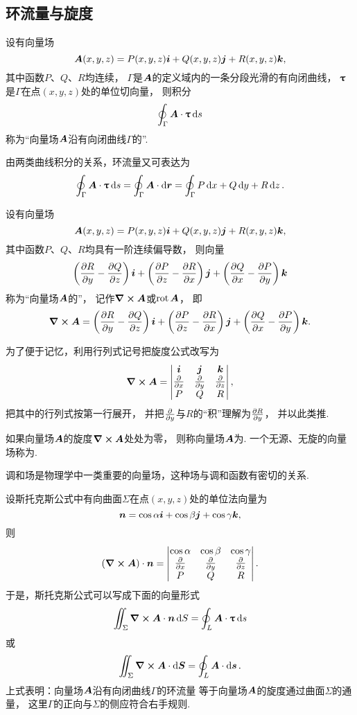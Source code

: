 \subsection{环流量与旋度}
\begin{definition}
设有向量场\[
\boldsymbol{A}(x,y,z)=P(x,y,z)\boldsymbol{i}+Q(x,y,z)\boldsymbol{j}+R(x,y,z)\boldsymbol{k},
\]其中函数\(P\)、\(Q\)、\(R\)均连续，
\(\Gamma\)是\(\boldsymbol{A}\)的定义域内的一条分段光滑的有向闭曲线，
\(\boldsymbol{\uptau}\)是\(\Gamma\)在点\((x,y,z)\)处的单位切向量，
则积分\[
	\oint_\Gamma \boldsymbol{A}\cdot\boldsymbol{\uptau}\dd{s}
\]称为“向量场\(\boldsymbol{A}\)沿有向闭曲线\(\Gamma\)的”.
\end{definition}
由两类曲线积分的关系，环流量又可表达为\[
	\oint_\Gamma \boldsymbol{A}\cdot\boldsymbol{\uptau}\dd{s}
	=\oint_\Gamma \boldsymbol{A}\cdot\dd{\boldsymbol{r}}
	=\oint_\Gamma P\dd{x}+Q\dd{y}+R\dd{z}.
\]

\begin{definition}
设有向量场\[
	\boldsymbol{A}(x,y,z)=P(x,y,z)\boldsymbol{i}+Q(x,y,z)\boldsymbol{j}+R(x,y,z)\boldsymbol{k},
\]
其中函数\(P\)、\(Q\)、\(R\)均具有一阶连续偏导数，
则向量\[
	\left( \pdv{R}{y} - \pdv{Q}{z} \right)\boldsymbol{i}
	+\left( \pdv{P}{z} - \pdv{R}{x} \right)\boldsymbol{j}
	+\left( \pdv{Q}{x} - \pdv{P}{y} \right)\boldsymbol{k}
\]
称为“向量场\(\boldsymbol{A}\)的”，
记作\(\curl{\boldsymbol{A}}\)或\(\operatorname{rot}\boldsymbol{A}\)，
即\[
	\curl{\boldsymbol{A}}
	=\left( \pdv{R}{y} - \pdv{Q}{z} \right)\boldsymbol{i}
	+\left( \pdv{P}{z} - \pdv{R}{x} \right)\boldsymbol{j}
	+\left( \pdv{Q}{x} - \pdv{P}{y} \right)\boldsymbol{k}.
\]
\end{definition}

为了便于记忆，利用行列式记号把旋度公式改写为\[
	\curl{\boldsymbol{A}}
	= \begin{vmatrix}
		\boldsymbol{i} & \boldsymbol{j} & \boldsymbol{k} \\
		\pdv{x} & \pdv{y} & \pdv{z} \\
		P & Q & R
	\end{vmatrix},
\]
把其中的行列式按第一行展开，
并把\(\pdv{y}\)与\(R\)的“积”理解为\(\pdv{R}{y}\)，
并以此类推.

\begin{definition}
如果向量场\(\boldsymbol{A}\)的旋度\(\curl{\boldsymbol{A}}\)处处为零，
则称向量场\(\boldsymbol{A}\)为.
一个无源、无旋的向量场称为.
\end{definition}
调和场是物理学中一类重要的向量场，这种场与调和函数有密切的关系.

设斯托克斯公式中有向曲面\(\Sigma\)在点\((x,y,z)\)处的单位法向量为\[
	\boldsymbol{n} = \cos\alpha \boldsymbol{i} + \cos\beta \boldsymbol{j} + \cos\gamma \boldsymbol{k},
\]
则\[
	(\curl{\boldsymbol{A}}) \cdot \boldsymbol{n} = \begin{vmatrix}
		\cos\alpha & \cos\beta & \cos\gamma \\
		\pdv{x} & \pdv{y} & \pdv{z} \\
		P & Q & R
	\end{vmatrix}.
\]
于是，斯托克斯公式可以写成下面的向量形式\[
	\iint_\Sigma \curl{\boldsymbol{A}} \cdot \boldsymbol{n} \dd{S}
	= \oint_L \boldsymbol{A} \cdot \boldsymbol{\uptau} \dd{s}
\]或\[
	\iint_\Sigma \curl{\boldsymbol{A}} \cdot \dd{\boldsymbol{S}}
	= \oint_L \boldsymbol{A} \cdot \dd{\boldsymbol{s}}.
\]
上式表明：向量场\(\boldsymbol{A}\)沿有向闭曲线\(\Gamma\)的环流量
等于向量场\(\boldsymbol{A}\)的旋度通过曲面\(\Sigma\)的通量，
这里\(\Gamma\)的正向与\(\Sigma\)的侧应符合右手规则.


